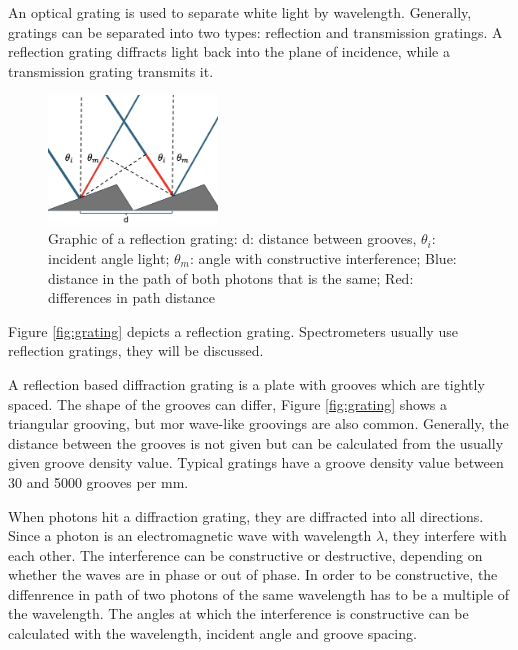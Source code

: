 An optical grating is used to separate white light by wavelength. Generally, gratings can be separated into two types: reflection and transmission gratings. A reflection grating diffracts light back into the plane of incidence, while a transmission grating transmits it. 
\begin{figure}
    \vspace{-15pt}
    \centering
    \includegraphics[width=0.4\textwidth]{images/setup_graphics/grating_graphic.png}
    \caption{Graphic of a reflection grating: d: distance between grooves, \(\theta_i\): incident angle light; \(\theta_m\): angle with constructive interference; Blue: distance in the path of both photons that is the same; Red: differences in path distance}
    \label{fig:grating_graphic}
\end{figure}
Figure \ref{fig:grating} depicts a reflection grating. Spectrometers usually use reflection gratings, they will be discussed.

\bigskip

A reflection based diffraction grating is a plate with grooves which are tightly spaced. The shape of the grooves can differ, Figure \ref{fig:grating} shows a triangular grooving, but mor wave-like groovings are also common. Generally, the distance between the grooves is not given but can be calculated from the usually given groove density value. Typical gratings have a groove density value between 30 and 5000 grooves per mm.

\bigskip


When photons hit a diffraction grating, they are diffracted into all directions. Since a photon is an electromagnetic wave with wavelength \(\lambda\), they interfere with each other. The interference can be constructive or destructive, depending on whether the waves are in phase or out of phase. In order to be constructive, the diffenrence in path of two photons of the same wavelength has to be a multiple of the wavelength. The angles at which the interference is constructive can be calculated with the wavelength, incident angle and groove spacing.


